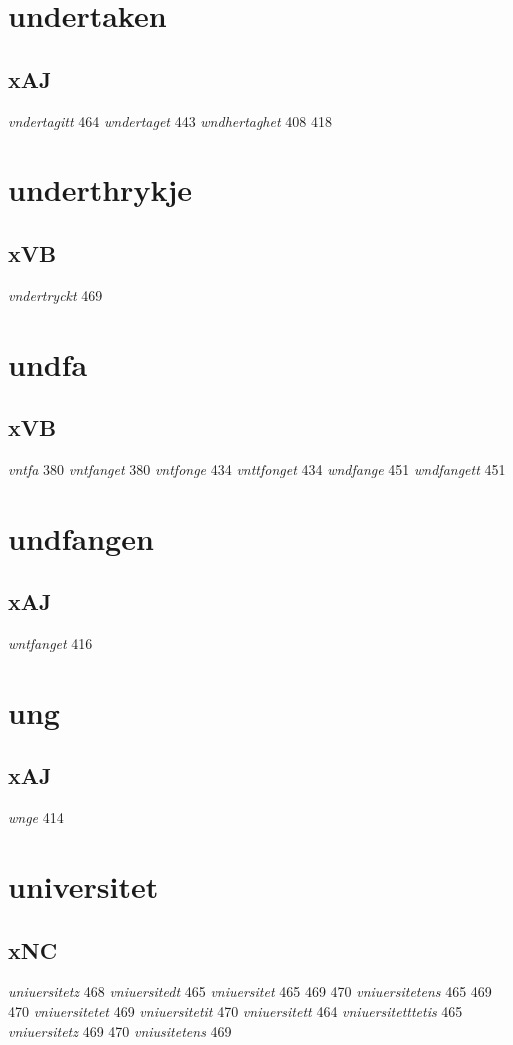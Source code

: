 \documentclass[a4paper,twocolumn]{article}
\begin{document}
\section{undertaken}
\label{sec:org3efa977}
\subsection{xAJ}
\label{sec:org83fef3a}
\emph{vndertagitt} 464 \emph{wndertaget} 443 \emph{wndhertaghet} 408 418 
\section{underthrykje}
\label{sec:org58079b1}
\subsection{xVB}
\label{sec:org9b1f9a4}
\emph{vndertryckt} 469 
\section{undfa}
\label{sec:org34a0412}
\subsection{xVB}
\label{sec:org219cafa}
\emph{vntfa} 380 \emph{vntfanget} 380 \emph{vntfonge} 434 \emph{vnttfonget} 434 \emph{wndfange} 451 \emph{wndfangett} 451 
\section{undfangen}
\label{sec:orgbcec906}
\subsection{xAJ}
\label{sec:org730decc}
\emph{wntfanget} 416 
\section{ung}
\label{sec:org68e1f1e}
\subsection{xAJ}
\label{sec:org0b1c0f1}
\emph{wnge} 414 
\section{universitet}
\label{sec:org111a683}
\subsection{xNC}
\label{sec:orgdc68c08}
\emph{uniuersitetz} 468 \emph{vniuersitedt} 465 \emph{vniuersitet} 465 469 470 \emph{vniuersitetens} 465 469 470 \emph{vniuersitetet} 469 \emph{vniuersitetit} 470 \emph{vniuersitett} 464 \emph{vniuersitetttetis} 465 \emph{vniuersitetz} 469 470 \emph{vniusitetens} 469 
\end{document}
